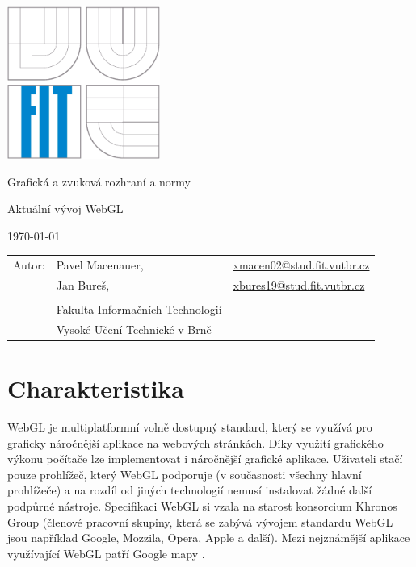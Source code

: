 \documentclass[12pt,a4paper,titlepage,final]{report}
\makeatletter
\newcommand\Course{	Grafická a zvuková rozhraní a normy}
\newcommand\WorkTitle{Aktuální vývoj WebGL}
\newcommand\AuthorA{Pavel Macenauer}
\newcommand\AuthorB{Jan Bureš}
\newcommand\AuthorAEmail{xmacen02@stud.fit.vutbr.cz}
\newcommand\AuthorBEmail{xbures19@stud.fit.vutbr.cz}
\newcommand\Faculty{Fakulta Informačních Technologií}
\newcommand\School{Vysoké Učení Technické v Brně}
\makeatother
\begin{document}
	\begin{titlepage}
	\begin{center}
		\includegraphics[height=5cm]{images/logo.eps}
	\end{center}
	\vfill
	\begin{center}
		\begin{Large}
			\Course\\
		\end{Large}
		\bigskip
		\begin{Huge}
			\WorkTitle\\
		\end{Huge}
	\end{center}
	\vfill
	\begin{center}
		\begin{large}
			\today
		\end{large}
	\end{center}
	\vfill
	\begin{flushleft}
		\begin{large}
			\begin{tabular}{lll}
				Autor: & \AuthorA, & \url{\AuthorAEmail} \\
				& \AuthorB, & \url{\AuthorBEmail} \\
		
				& & \\
				& \Faculty \\
				& \School \\
			\end{tabular}
		\end{large}
	\end{flushleft}
\end{titlepage}		



\newpage

\section{Charakteristika}
WebGL je multiplatformní volně dostupný standard, který se využívá pro graficky náročnější aplikace na webových stránkách. Díky využití grafického výkonu počítače lze implementovat i náročnější grafické aplikace. Uživateli stačí pouze prohlížeč, který WebGL podporuje (v současnosti všechny hlavní prohlížeče) a na rozdíl od jiných technologií nemusí instalovat žádné další podpůrné nástroje. Specifikaci WebGL si vzala na starost konsorcium Khronos Group (členové pracovní skupiny, která se zabývá vývojem standardu WebGL jsou například Google, Mozzila, Opera, Apple a další). Mezi nejznámější aplikace využívající WebGL patří Google mapy \cite{maps}.      
\end{document}
